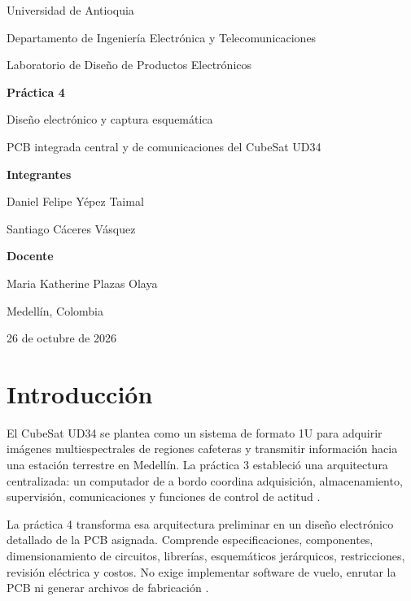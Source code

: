\documentclass[11pt,letterpaper]{article}
\begin{document}
\begin{titlepage}
\centering
{\large Universidad de Antioquia\par}
{Departamento de Ingeniería Electrónica y Telecomunicaciones\par}
\vspace{1.5cm}
{\Large Laboratorio de Diseño de Productos Electrónicos\par}
\vspace{0.6cm}
{\huge\bfseries Práctica 4\par}
\vspace{0.4cm}
{\LARGE Diseño electrónico y captura esquemática\par}
\vspace{0.8cm}
{\Large PCB integrada central y de comunicaciones del CubeSat UD34\par}
\vfill
\textbf{Integrantes}\par
Daniel Felipe Yépez Taimal\par
Santiago Cáceres Vásquez\par
\vspace{0.5cm}
\textbf{Docente}\par
Maria Katherine Plazas Olaya\par
\vspace{0.6cm}
Medellín, Colombia\par
26 de octubre de 2026\par
\vspace{0.5cm}

\end{titlepage}

\tableofcontents
\newpage
\section{Introducción}
El CubeSat UD34 se plantea como un sistema de formato 1U para adquirir imágenes multiespectrales de regiones cafeteras y transmitir información hacia una estación terrestre en Medellín. La práctica 3 estableció una arquitectura centralizada: un computador de a bordo coordina adquisición, almacenamiento, supervisión, comunicaciones y funciones de control de actitud \cite{lab3}.

La práctica 4 transforma esa arquitectura preliminar en un diseño electrónico detallado de la PCB asignada. Comprende especificaciones, componentes, dimensionamiento de circuitos, librerías, esquemáticos jerárquicos, restricciones, revisión eléctrica y costos. No exige implementar software de vuelo, enrutar la PCB ni generar archivos de fabricación \cite{guia4}.
\end{document}
